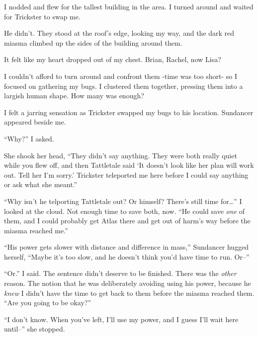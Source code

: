 I nodded and flew for the tallest building in the area.  I turned around and waited for Trickster to swap me.



He didn't.  They stood at the roof's edge, looking my way, and the dark red miasma climbed up the sides of the building around them.



It felt like my heart dropped out of my chest.  Brian, Rachel, now Lisa?



I couldn't afford to turn around and confront them -time was too short- so I focused on gathering my bugs.  I clustered them together, pressing them into a largish human shape.  How many was enough?



I felt a jarring sensation as Trickster swapped my bugs to his location.  Sundancer appeared beside me.



``Why?''  I asked.



She shook her head, ``They didn't say anything.  They were both really quiet while you flew off, and then Tattletale said `It doesn't look like her plan will work out.  Tell her I'm sorry.'  Trickster teleported me here before I could say anything or ask what she meant.''



``Why isn't he telporting Tattletale out?  Or himself?  There's still time for\ldots''  I looked at the cloud.  Not enough time to save both, now.  ``He could save \emph{one} of them, and I could probably get Atlas there and get out of harm's way before the miasma reached me.''



``His power gets slower with distance and difference in mass,''  Sundancer hugged herself, ``Maybe it's too slow, and he doesn't think you'd have time to run.  Or--''



``Or.''  I said.  The sentence didn't deserve to be finished.  There was the \emph{other} reason.  The notion that he was deliberately avoiding using his power, because he \emph{knew} I didn't have the time to get back to them before the miasma reached them.  ``Are you going to be okay?''



``I don't know.  When you've left, I'll use my power, and I guess I'll wait here until--''  she stopped.



